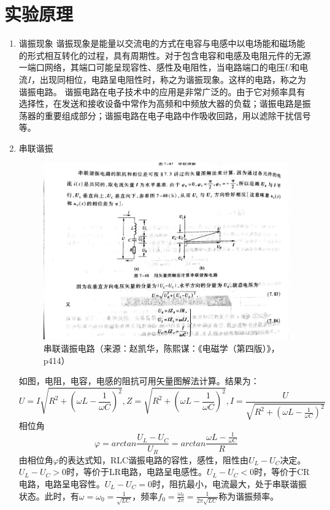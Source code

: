 \documentclass[UTF8]{article}
\begin{document}
\section{实验原理}
\begin{enumerate}
    \item 谐振现象 \newline \hspace*{2em} 
    谐振现象是能量以交流电的方式在电容与电感中以电场能和磁场能的形式相互转化的过程，具有周期性。对于包含电容和电感及电阻元件的无源一端口网络，其端口可能呈现容性、感性及电阻性，当电路端口的电压$U$和电流$I$，出现同相位，电路呈电阻性时，称之为谐振现象。这样的电路，称之为谐振电路。  谐振电路在电子技术中的应用是非常广泛的。由于它对频率具有选择性，在发送和接收设备中常作为高频和中频放大器的负载；谐振电路是振荡器的重要组成部分；谐振电路在电子电路中作吸收回路，用以滤除干扰信号等。
    \item 串联谐振 \newline \hspace*{2em} 
    \begin{figure}[H]
        \centering
        \includegraphics[width=12cm]{Fig/1.jpg}
        \caption{串联谐振电路（来源：赵凯华，陈熙谋：《电磁学（第四版）》，p414）}
    \end{figure}
    \hspace*{2em}如图，电阻，电容，电感的阻抗可用矢量图解法计算。结果为：
        \[U=I\sqrt{R^2+\left(\omega L-\frac{1}{\omega C}\right)^2},Z=\sqrt{R^2+\left(\omega L-\frac{1}{\omega C}\right)^2},I=\frac{U}{\sqrt{R^2+\left(\omega L-\frac{1}{\omega C}\right)^2}}\]
    \hspace*{2em}相位角
        \[\varphi=arctan{\frac{U_L-U_C}{U_R}}=arctan\frac{\omega L-\frac{1}{\omega C}}{R}\]
    \hspace*{2em} 由相位角$\varphi$的表达式知，RLC谐振电路的容性，感性，阻性由$U_L-U_C$决定。$U_L-U_C>0$时，等价于LR电路，电路呈电感性。$U_L-U_C<0$时，等价于CR电路，电路呈电容性。$U_L-U_C=0$时，阻抗最小，电流最大，处于串联谐振状态。此时，有$\omega=\omega_0=\frac{1}{\sqrt{LC}}$，频率$f_0=\frac{\omega_0}{2\pi}=\frac{1}{2\pi\sqrt{LC}}$称为谐振频率。

\end{enumerate}
\end{document}

